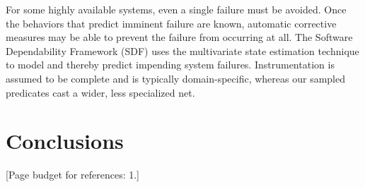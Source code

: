 \documentclass{sig-alternate}
\newcommand{\placeholder}[1]{{\color[cmyk]{0,0.61,0.87,0}[#1]}}
\newcommand{\comment}[1]{}
\begin{document}
For some highly available systems, even a single failure must be
avoided.  Once the behaviors that predict imminent failure are known,
automatic corrective measures may be able to prevent the failure from
occurring at all.  The Software Dependability Framework (SDF)
\cite{Gross:2003:PSMUST} uses the multivariate state estimation
technique to model and thereby predict impending system failures.
Instrumentation is assumed to be complete and is typically
domain-specific, whereas our sampled predicates cast a wider, less
specialized net.  \comment{We understand through informal
  communication that the SDF is able to anticipate when a player is
  about to lose an instrumented game of Tetris, and can intervene by
  removing rows to allow the game to continue.  But maybe I shouldn't
  say that, as it kind of makes their system sound like a joke.}

\comment{Cannot find any more recent work by these people in this
  area.  Where did they all go?  Porter has plenty of other recent
  work, but apparently nothing related.  Gross and McMaster have zero
  publication information on their home pages, while Umranov and Votta
  seem to have vanished entirely.  Have written to Gross and Porter
  asking if they have anything more recent I should look at.}

\section{Conclusions}
\label{sec:conclusions}


\placeholder{Page budget for references: 1.}
\end{document}
